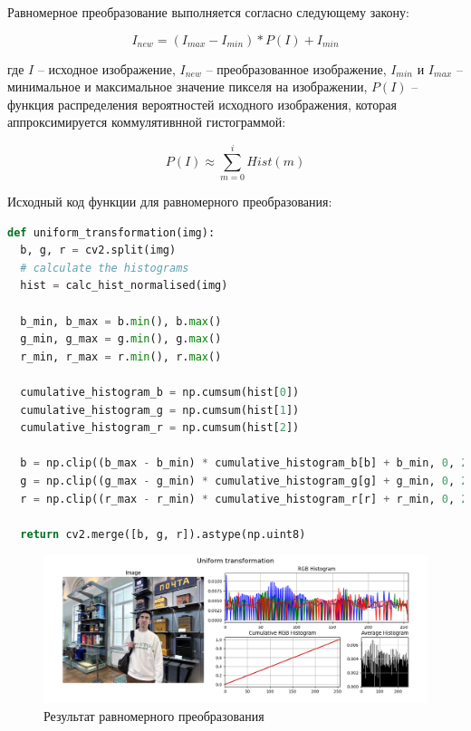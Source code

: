 Равномерное преобразование выполняется согласно следующему закону:

\begin{equation}
  I_{new} = \left( I_{max} - I_{min} \right) * P(I) + I_{min}
\end{equation}

где $I$ -- исходное изображение, $I_{new}$ -- преобразованное изображение, $I_{min}$ и $I_{max}$ -- минимальное и максимальное значение пикселя на изображении, $P(I)$ -- функция распределения вероятностей исходного изображения, которая аппроксимируется коммулятивнной гистограммой: 

\begin{equation}
  P(I) \approx \sum\limits_{m=0}^{i} Hist(m)
\end{equation}

Исходный код функции для равномерного преобразования:

\begin{lstlisting}[language=Python]
def uniform_transformation(img):
  b, g, r = cv2.split(img)
  # calculate the histograms
  hist = calc_hist_normalised(img)

  b_min, b_max = b.min(), b.max()
  g_min, g_max = g.min(), g.max()
  r_min, r_max = r.min(), r.max()

  cumulative_histogram_b = np.cumsum(hist[0]) 
  cumulative_histogram_g = np.cumsum(hist[1])
  cumulative_histogram_r = np.cumsum(hist[2])

  b = np.clip((b_max - b_min) * cumulative_histogram_b[b] + b_min, 0, 255)
  g = np.clip((g_max - g_min) * cumulative_histogram_g[g] + g_min, 0, 255)
  r = np.clip((r_max - r_min) * cumulative_histogram_r[r] + r_min, 0, 255)

  return cv2.merge([b, g, r]).astype(np.uint8)
\end{lstlisting}

\begin{figure}[H]
    \centering
    \includegraphics[width=\textwidth]{../results/Uniform transformation.png}
    \caption{Результат равномерного преобразования}
    \label{fig:uniform}
\end{figure}

